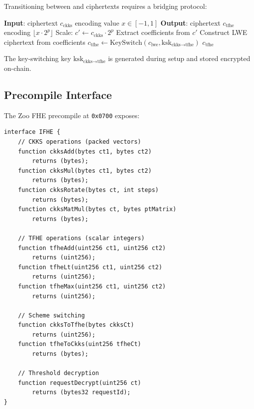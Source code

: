 Transitioning between \CKKS{} and \TFHE{} ciphertexts requires a bridging protocol:

\begin{algorithm}[t]
\caption{CKKS-to-TFHE Bridge}
\label{alg:bridge}
\begin{algorithmic}[1]
\STATE \textbf{Input}: \CKKS{} ciphertext $c_{\text{ckks}}$ encoding value $x \in [-1, 1]$
\STATE \textbf{Output}: \TFHE{} ciphertext $c_{\text{tfhe}}$ encoding $\lfloor x \cdot 2^p \rfloor$
\STATE Scale: $c' \leftarrow c_{\text{ckks}} \cdot 2^p$
\STATE Extract coefficients from $c'$
\STATE Construct LWE ciphertext from coefficients
\STATE $c_{\text{tfhe}} \leftarrow \text{KeySwitch}(c_{\text{lwe}}, \text{ksk}_{\text{ckks} \to \text{tfhe}})$
\RETURN $c_{\text{tfhe}}$
\end{algorithmic}
\end{algorithm}

The key-switching key $\text{ksk}_{\text{ckks} \to \text{tfhe}}$ is generated during setup and stored encrypted on-chain.

\subsection{Precompile Interface}

The Zoo FHE precompile at \texttt{0x0700} exposes:

\begin{lstlisting}[basicstyle=\ttfamily\small,caption=Zoo FHE Precompile Interface]
interface IFHE {
    // CKKS operations (packed vectors)
    function ckksAdd(bytes ct1, bytes ct2)
        returns (bytes);
    function ckksMul(bytes ct1, bytes ct2)
        returns (bytes);
    function ckksRotate(bytes ct, int steps)
        returns (bytes);
    function ckksMatMul(bytes ct, bytes ptMatrix)
        returns (bytes);

    // TFHE operations (scalar integers)
    function tfheAdd(uint256 ct1, uint256 ct2)
        returns (uint256);
    function tfheLt(uint256 ct1, uint256 ct2)
        returns (uint256);
    function tfheMax(uint256 ct1, uint256 ct2)
        returns (uint256);

    // Scheme switching
    function ckksToTfhe(bytes ckksCt)
        returns (uint256);
    function tfheToCkks(uint256 tfheCt)
        returns (bytes);

    // Threshold decryption
    function requestDecrypt(uint256 ct)
        returns (bytes32 requestId);
}
\end{lstlisting}

